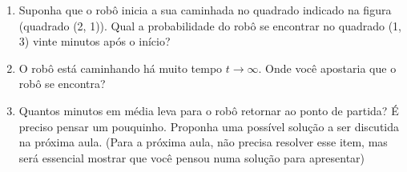 \begin{enumerate}
    \item Suponha que o robô inicia a sua caminhada no quadrado indicado na figura (quadrado (2, 1)). Qual a probabilidade do robô se encontrar no quadrado (1, 3) vinte minutos após o início?

    \item O robô está caminhando há muito tempo $t \to \infty$. Onde você apostaria que o robô se encontra?

    \item Quantos minutos em média leva para o robô retornar ao ponto de partida? É preciso pensar um pouquinho. Proponha uma possível solução a ser discutida na próxima aula. (Para a próxima aula, não precisa resolver esse item, mas será essencial mostrar que você pensou numa solução para apresentar)
\end{enumerate}
